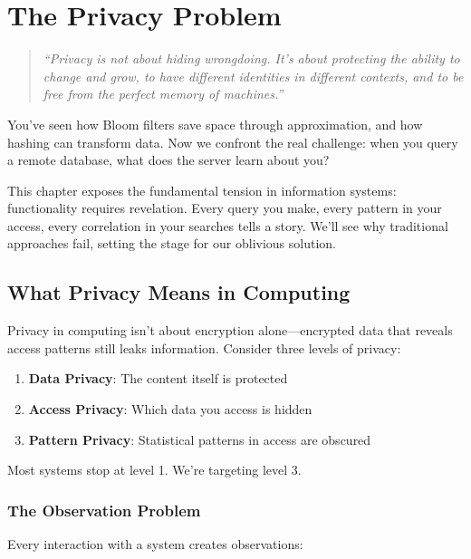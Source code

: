 \chapter{The Privacy Problem}
\label{ch:privacy-problem}

\begin{quote}
\textit{``Privacy is not about hiding wrongdoing. It's about protecting the ability to change and grow, to have different identities in different contexts, and to be free from the perfect memory of machines.''}
\end{quote}

You've seen how Bloom filters save space through approximation, and how hashing can transform data. Now we confront the real challenge: when you query a remote database, what does the server learn about you?

This chapter exposes the fundamental tension in information systems: functionality requires revelation. Every query you make, every pattern in your access, every correlation in your searches tells a story. We'll see why traditional approaches fail, setting the stage for our oblivious solution.

\section{What Privacy Means in Computing}

Privacy in computing isn't about encryption alone---encrypted data that reveals access patterns still leaks information. Consider three levels of privacy:

\begin{enumerate}
\item \textbf{Data Privacy}: The content itself is protected
\item \textbf{Access Privacy}: Which data you access is hidden  
\item \textbf{Pattern Privacy}: Statistical patterns in access are obscured
\end{enumerate}

Most systems stop at level 1. We're targeting level 3.

\subsection{The Observation Problem}

Every interaction with a system creates observations:

